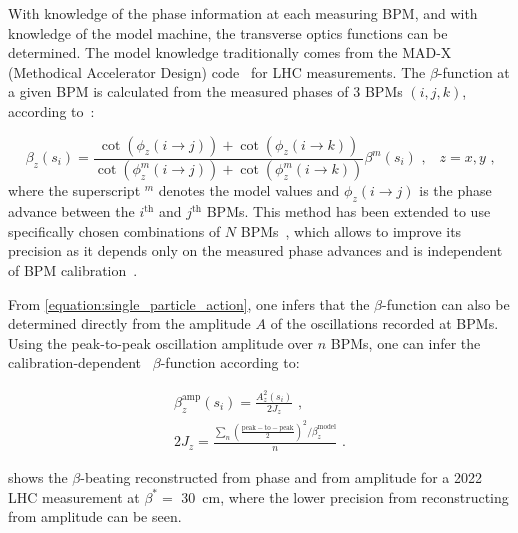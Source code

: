 With knowledge of the phase information at each measuring BPM, and with knowledge of the model machine, the transverse optics functions can be determined.
The model knowledge traditionally comes from the MAD-X (Methodical Accelerator Design) code~\cite{CODE:MADX_guide} for LHC measurements.
The \(\beta\)-function at a given BPM is calculated from the measured phases of \num{3} BPMs \((i, j, k)\), according to~\cite{PHD:Castro,BOOK:Minty:Measurements_Control_Charged_Particle_Beams}:

\begin{equation}
  \beta_z(s_i) = \frac{\cot \left(\phi_z(i \rightarrow j)\right) + \cot \left(\phi_z(i \rightarrow k)\right)}{\cot \left(\phi^m_z(i \rightarrow j)\right) + \cot \left(\phi^m_z(i \rightarrow k)\right)} \beta^m(s_i)  \text{ ,} \quad z = x, y \text{ ,}
  \label{equation:beta_from_phase}
\end{equation}
where the superscript \(^m\) denotes the model values and \(\phi_z(i \rightarrow j)\) is the phase advance between the \(i^{\mathrm{th}}\) and \(j^{\mathrm{th}}\) BPMs.
This method has been extended to use specifically chosen combinations of \(N\) BPMs~\cite{PRAB:Langner:N_BPM_Method,PRAB:Wegscheider:Analytical_N_BPM_Method}, which allows to improve its precision as it depends only on the measured phase advances and is independent of BPM calibration~\cite{PRAB:Langner:Optics_Measurement_Algorithms_Error_Analysis_Proton_Energy_Frontier}.

From \cref{equation:single_particle_action}, one infers that the \(\beta\)-function can also be determined directly from the amplitude \(A\) of the oscillations recorded at BPMs.
Using the peak-to-peak oscillation amplitude over \(n\) BPMs, one can infer the calibration-dependent~\cite{PRAB:GarciaTabares:BPM_Calibration} \(\beta\)-function according to:

\begin{equation}
  \begin{gathered}
    \beta_z^{\mathrm{amp}}(s_i) = \frac{A_z^2(s_i)}{2 J_z} \text{ ,} \\
    2 J_z                       = \frac{\sum_n \left(\frac{\mathrm{peak-to-peak}}{2}\right)^2 / \beta_z^{\mathrm{model}}}{n} \text{ .}
  \end{gathered}
  \label{equation:beta_from_amplitude}
\end{equation}

 shows the \(\beta\)-beating reconstructed from phase and from amplitude for a \num{2022} LHC measurement at \(\beta^{\ast} =\) \qty{30}{\centi\meter}, where the lower precision from reconstructing from amplitude can be seen.

